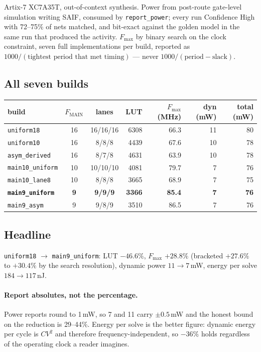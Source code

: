 \documentclass[11pt,a4paper]{article}
\begin{document}
Artix-7 XC7A35T, out-of-context synthesis. Power from post-route gate-level
simulation writing SAIF, consumed by \texttt{report\_power}; every run
Confidence High with 72--75\% of nets matched, and bit-exact against the golden
model in the same run that produced the activity. $F_{\max}$ by binary search
on the clock constraint, seven full implementations per build, reported as
$1000/(\text{tightest period that met timing})$ --- never
$1000/(\text{period} - \text{slack})$.

\subsection{All seven builds}

\begin{table}[h]\centering\small
\begin{tabular}{lccrrrr}
\toprule
build & $F_{\text{MAIN}}$ & lanes & LUT & $F_{\max}$ (MHz) & dyn (mW) & total (mW)\\
\midrule
\texttt{uniform18}      & 16 & 16/16/16 & 6308 & 66.3 & 11 & 80 \\
\texttt{uniform10}      & 16 & 8/8/8    & 4439 & 67.6 & 10 & 78 \\
\texttt{asym\_derived}  & 16 & 8/7/8    & 4631 & 63.9 & 10 & 78 \\
\texttt{main10\_uniform}& 10 & 10/10/10 & 4081 & 79.7 &  7 & 76 \\
\texttt{main10\_lane8}  & 10 & 8/8/8    & 3665 & 68.9 &  7 & 75 \\
\textbf{\texttt{main9\_uniform}} & \textbf{9} & \textbf{9/9/9}
                                          & \textbf{3366} & \textbf{85.4}
                                          & \textbf{7} & \textbf{76} \\
\texttt{main9\_asym}    &  9 & 9/8/9    & 3510 & 86.5 &  7 & 76 \\
\bottomrule
\end{tabular}
\end{table}

\subsection{Headline}

\texttt{uniform18} $\to$ \texttt{main9\_uniform}: LUT $-46.6\%$, $F_{\max}$
$+28.8\%$ (bracketed $+27.6\%$ to $+30.4\%$ by the search resolution), dynamic
power $11 \to 7$\,mW, energy per solve $184 \to 117$\,nJ.

\paragraph{Report absolutes, not the percentage.} Power reports round to
1\,mW, so 7 and 11 carry $\pm 0.5$\,mW and the honest bound on the reduction is
29--44\%. Energy per solve is the better figure: dynamic energy per cycle is
$CV^2$ and therefore frequency-independent, so $-36\%$ holds regardless of the
operating clock a reader imagines.
\end{document}
